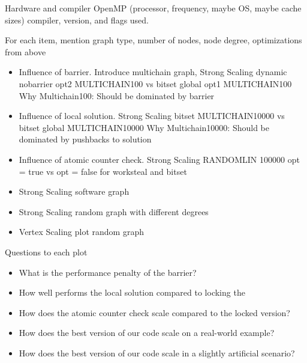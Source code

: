 \begin{invisible}
	{\Large \color{red} Hardware and compiler}
 \Cpp  OpenMP
 (processor, frequency, maybe OS, maybe cache sizes)
 compiler, version, and flags used.

 For each item, mention graph type, number of nodes, node degree, optimizations from above
 \begin{itemize}
  \item Influence of barrier. Introduce multichain graph, Strong Scaling dynamic nobarrier opt2 MULTICHAIN100 vs bitset global opt1 MULTICHAIN100 Why Multichain100: Should be dominated by barrier%
  \item Influence of local solution. Strong Scaling bitset MULTICHAIN10000 vs bitset global MULTICHAIN10000 Why Multichain10000: Should be dominated by pushbacks to solution
  \item Influence of atomic counter check. Strong Scaling RANDOMLIN 100000 opt = true vs opt = false for worksteal and bitset
  \item Strong Scaling software graph \cite{musco2014generative}
  \item Strong Scaling random graph with different degrees
  \item Vertex Scaling plot random graph
 \end{itemize}


Questions to each plot
\begin{itemize}
 \item What is the performance penalty of the barrier?
 \item How well performs the local solution compared to locking the 
 \item How does the atomic counter check scale compared to the locked version?
 \item How does the best version of our code scale on a real-world example?
 \item How does the best version of our code scale in a slightly artificial scenario?
\end{itemize}
\end{invisible}
